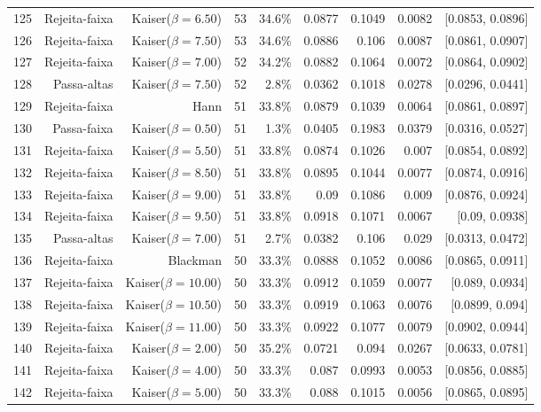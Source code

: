 \begin{longtable}{lrrrrrrrr}
    125 & Rejeita-faixa & Kaiser($\beta=6.50$) & 53 & 34.6\% & 0.0877 & 0.1049 & 0.0082 & [0.0853, 0.0896] \\
    126 & Rejeita-faixa & Kaiser($\beta=7.50$) & 53 & 34.6\% & 0.0886 & 0.106 & 0.0087 & [0.0861, 0.0907] \\
    127 & Rejeita-faixa & Kaiser($\beta=7.00$) & 52 & 34.2\% & 0.0882 & 0.1064 & 0.0072 & [0.0864, 0.0902] \\
    128 & Passa-altas & Kaiser($\beta=7.50$) & 52 & 2.8\% & 0.0362 & 0.1018 & 0.0278 & [0.0296, 0.0441] \\
    129 & Rejeita-faixa & Hann & 51 & 33.8\% & 0.0879 & 0.1039 & 0.0064 & [0.0861, 0.0897] \\
    130 & Passa-faixa & Kaiser($\beta=0.50$) & 51 & 1.3\% & 0.0405 & 0.1983 & 0.0379 & [0.0316, 0.0527] \\
    131 & Rejeita-faixa & Kaiser($\beta=5.50$) & 51 & 33.8\% & 0.0874 & 0.1026 & 0.007 & [0.0854, 0.0892] \\
    132 & Rejeita-faixa & Kaiser($\beta=8.50$) & 51 & 33.8\% & 0.0895 & 0.1044 & 0.0077 & [0.0874, 0.0916] \\
    133 & Rejeita-faixa & Kaiser($\beta=9.00$) & 51 & 33.8\% & 0.09 & 0.1086 & 0.009 & [0.0876, 0.0924] \\
    134 & Rejeita-faixa & Kaiser($\beta=9.50$) & 51 & 33.8\% & 0.0918 & 0.1071 & 0.0067 & [0.09, 0.0938] \\
    135 & Passa-altas & Kaiser($\beta=7.00$) & 51 & 2.7\% & 0.0382 & 0.106 & 0.029 & [0.0313, 0.0472] \\
    136 & Rejeita-faixa & Blackman & 50 & 33.3\% & 0.0888 & 0.1052 & 0.0086 & [0.0865, 0.0911] \\
    137 & Rejeita-faixa & Kaiser($\beta=10.00$) & 50 & 33.3\% & 0.0912 & 0.1059 & 0.0077 & [0.089, 0.0934] \\
    138 & Rejeita-faixa & Kaiser($\beta=10.50$) & 50 & 33.3\% & 0.0919 & 0.1063 & 0.0076 & [0.0899, 0.094] \\
    139 & Rejeita-faixa & Kaiser($\beta=11.00$) & 50 & 33.3\% & 0.0922 & 0.1077 & 0.0079 & [0.0902, 0.0944] \\
    140 & Rejeita-faixa & Kaiser($\beta=2.00$) & 50 & 35.2\% & 0.0721 & 0.094 & 0.0267 & [0.0633, 0.0781] \\
    141 & Rejeita-faixa & Kaiser($\beta=4.00$) & 50 & 33.3\% & 0.087 & 0.0993 & 0.0053 & [0.0856, 0.0885] \\
    142 & Rejeita-faixa & Kaiser($\beta=5.00$) & 50 & 33.3\% & 0.088 & 0.1015 & 0.0056 & [0.0865, 0.0895] \\

\end{longtable}
